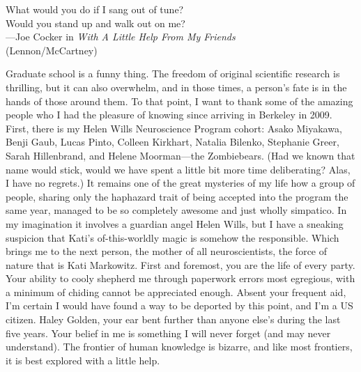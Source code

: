 \documentclass{ucbthesis}
\begin{document}
\begin{frontmatter}
\begin{acknowledgements}
\vfil\null
\begin{center}
What would you do if I sang out of tune?\\Would you stand up and walk out on me?\\
\vspace{5 mm}
 ---Joe Cocker in \textit{With A Little Help From My Friends}\\(Lennon/McCartney)
\end{center}
\vfil\null
Graduate school is a funny thing. The freedom of original scientific research is thrilling, but it can also overwhelm, and in those times, a person's fate is in the hands of those around them. To that point, I want to thank some of the amazing people who I had the pleasure of knowing since arriving in Berkeley in 2009. First, there is my Helen Wills Neuroscience Program cohort: Asako Miyakawa, Benji Gaub, Lucas Pinto, Colleen Kirkhart, Natalia Bilenko, Stephanie Greer, Sarah Hillenbrand, and Helene Moorman---the Zombiebears. (Had we known that name would stick, would we have spent a little bit more time deliberating? Alas, I have no regrets.) It remains one of the great mysteries of my life how a group of people, sharing only the haphazard trait of being accepted into the program the same year, managed to be so completely awesome and just wholly simpatico. In my imagination it involves a guardian angel Helen Wills, but I have a sneaking suspicion that Kati's of-this-worldly magic is somehow the responsible. Which brings me to the next person, the mother of all neuroscientists, the force of nature that is Kati Markowitz. First and foremost, you are the life of every party. Your ability to cooly shepherd me through paperwork errors most egregious, with a minimum of chiding cannot be appreciated enough. Absent your frequent aid, I'm certain I would have found a way to be deported by this point, and I'm a US citizen. Haley Golden, your ear bent further than anyone else's during the last five years. Your belief in me is something I will never forget (and may never understand). The frontier of human knowledge is bizarre, and like most frontiers, it is best explored with a little help.
\end{acknowledgements}

\end{frontmatter}

\pagestyle{headings}







\printbibliography
\end{document}

